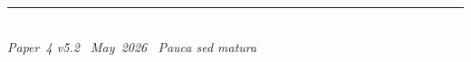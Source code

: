 \documentclass[11pt]{article}
\begin{document}
\enlargethispage{3\baselineskip}
\vspace*{\fill}
\begin{minipage}{\linewidth}
\rule{\linewidth}{0.4pt}\smallskip\\
\small\emph{Paper~4 v5.2 \textperiodcentered\ May~2026
\textperiodcentered\ Pauca sed matura}
\end{minipage}
\end{document}
